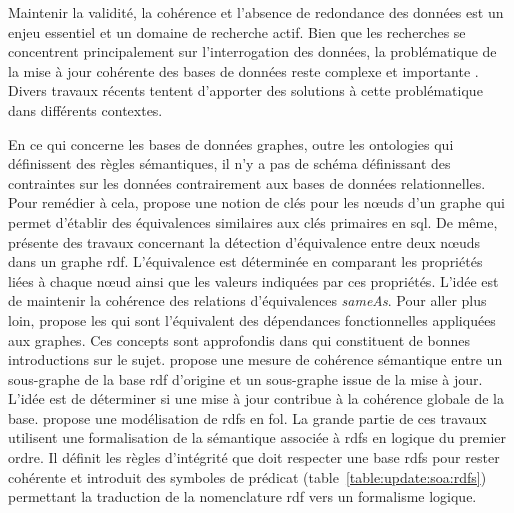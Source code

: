 Maintenir la validité, la cohérence et l'absence de redondance des données est un enjeu essentiel et un domaine de recherche actif.
Bien que les recherches se concentrent principalement sur l'interrogation des données, la problématique de la mise à jour cohérente des bases de données reste complexe et importante \cite{alvesUpdateRulesDatalog1998,scheweLimitationsRuleTriggering1998}.
Divers travaux récents tentent d'apporter des solutions à cette problématique dans différents contextes.

En ce qui concerne les bases de données graphes, outre les ontologies qui définissent des règles sémantiques, il n'y a pas de schéma définissant des contraintes sur les données contrairement aux bases de données relationnelles.
Pour remédier à cela, \cite{fanKeysGraphs2015} propose une notion de clés pour les nœuds d'un graphe qui permet d'établir des équivalences similaires aux clés primaires en \gls{sql}.
De même, \cite{raadDetectionLiensIdentite2017} présente des travaux concernant la détection d'équivalence entre deux nœuds dans un graphe \gls{rdf}.
L'équivalence est déterminée en comparant les propriétés liées à chaque nœud ainsi que les valeurs indiquées par ces propriétés.
L'idée est de maintenir la cohérence des relations d'équivalences \textit{sameAs}.
Pour aller plus loin, \cite{fanDependenciesGraphs2019} propose les  qui sont l'équivalent des dépendances fonctionnelles appliquées aux graphes.
Ces concepts sont approfondis dans \cite{anglesPgkeysKeysProperty2021,bonifatiQueryingGraphs2018} qui constituent de bonnes introductions sur le sujet.
\cite{maillotConsistencyEvaluationRDF2014} propose une mesure de cohérence sémantique entre un sous-graphe de la base \gls{rdf} d'origine et un sous-graphe issue de la mise à jour.
L'idée est de déterminer si une mise à jour contribue à la cohérence globale de la base.
\cite{flourisFormalFoundationsRDF2013} propose une modélisation de \gls{rdfs} en \gls{fol}.
La grande partie de ces travaux utilisent une formalisation de la sémantique associée à \gls{rdfs} en logique du premier ordre.
Il définit les règles d'intégrité que doit respecter une base \gls{rdfs} pour rester cohérente et introduit des symboles de prédicat (table~\ref{table:update:soa:rdfs}) permettant la traduction de la nomenclature \gls{rdf} vers un formalisme logique.

